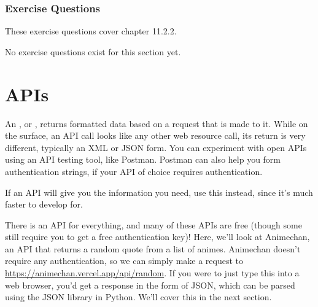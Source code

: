 \subsubsection*{Exercise Questions}
These exercise questions cover chapter 11.2.2.

No exercise questions exist for this section yet.

\section{APIs}
An , or , returns formatted data based on a request that is made to it. While on the surface, an API call looks like any other web resource call, its return is very different, typically an XML or JSON form. You can experiment with open APIs using an API testing tool, like Postman. Postman can also help you form authentication strings, if your API of choice requires authentication.\par
If an API will give you the information you need, use this instead, since it's much faster to develop for.\par
There is an API for everything, and many of these APIs are free (though some still require you to get a free authentication key)! Here, we'll look at Animechan, an API that returns a random quote from a list of animes. Animechan doesn't require any authentication, so we can simply make a request to \href{https://animechan.vercel.app/api/random}{https://animechan.vercel.app/api/random}. If you were to just type this into a web browser, you'd get a response in the form of JSON, which can be parsed using the JSON library in Python. We'll cover this in the next section.\par

